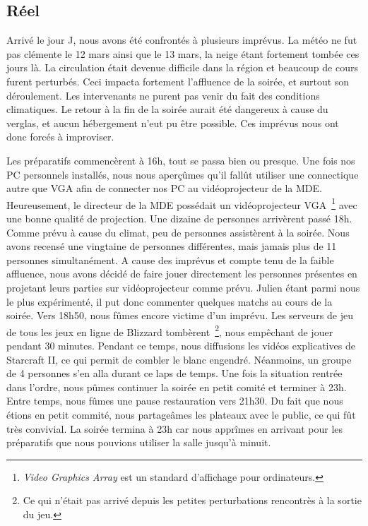 \subsection{Réel}%
\label{sub:reel}

Arrivé le jour J, nous avons été confrontés à plusieurs imprévus.
La météo ne fut pas clémente le 12 mars ainsi que le 13 mars, la neige étant fortement
tombée ces jours là. La circulation était devenue difficile dans la région et beaucoup de cours
furent perturbés.
Ceci impacta fortement l’affluence de la soirée, et surtout son déroulement. Les intervenants
ne purent pas venir du fait des conditions climatiques. Le retour à la fin de la soirée aurait été
dangereux à cause du verglas, et aucun hébergement n’eut pu être possible.
Ces imprévus nous ont donc forcés à improviser.

Les préparatifs commencèrent à 16h, tout se passa bien ou presque. Une fois nos PC personnels
installés, nous nous aperçûmes qu’il fallût utiliser une connectique autre que VGA afin de
connecter nos PC au vidéoprojecteur de la MDE. Heureusement, le
directeur de la MDE 
possédait un vidéoprojecteur VGA\, \footnote{\emph{Video Graphics
Array} est un standard d'affichage pour ordinateurs.} avec une bonne qualité de projection.
Une dizaine de personnes arrivèrent passé 18h. Comme prévu à cause du climat, peu de
personnes assistèrent à la soirée. Nous avons recensé une vingtaine de personnes
différentes, mais jamais plus de 11 personnes simultanément.
A cause des imprévus et compte tenu de la faible affluence, nous avons décidé de faire jouer
directement les personnes présentes en projetant leurs parties sur vidéoprojecteur comme
prévu. Julien étant parmi nous le plus expérimenté, il put donc commenter quelques matchs
au cours de la soirée.
Vers 18h50, nous fûmes encore victime d’un imprévu. Les serveurs de jeu de tous les jeux en
ligne de Blizzard tombèrent\, \footnote{Ce qui n'était pas arrivé depuis
les petites perturbations rencontrès à la sortie du jeu.}, nous empêchant de jouer pendant 30 minutes. Pendant ce
temps, nous diffusions les vidéos explicatives de Starcraft II, ce qui permit de combler le
blanc engendré. Néanmoins, un groupe de 4 personnes s’en alla durant ce laps de temps.
Une fois la situation rentrée dans l’ordre, nous pûmes continuer la soirée en petit comité et
terminer à 23h. Entre temps, nous fûmes une pause restauration vers
21h30. Du fait que nous étions en petit commité, nous
partageâmes les plateaux avec le public, ce qui fût très
convivial. La soirée termina à 23h car nous apprîmes en arrivant pour les préparatifs
que nous pouvions utiliser la salle jusqu’à minuit.

